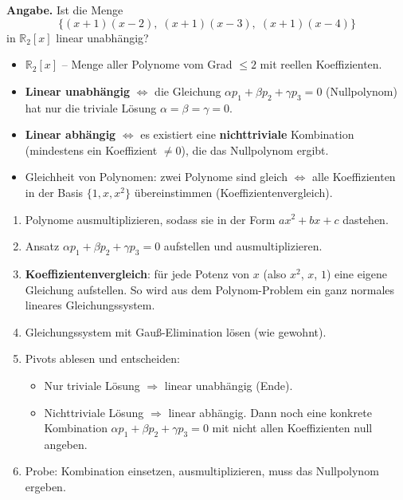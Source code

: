 \documentclass[a4paper,12pt]{article}
\begin{document}
\textbf{Angabe.} Ist die Menge
\[
\{(x+1)(x-2),\; (x+1)(x-3),\; (x+1)(x-4)\}
\]
in $\mathbb{R}_2[x]$ linear unabh\"angig?

\begin{begriffe}
\begin{itemize}[leftmargin=*, nosep]
    \item $\mathbb{R}_2[x]$ -- Menge aller Polynome vom Grad $\leq 2$ mit reellen Koeffizienten.
    \item \textbf{Linear unabh\"angig} $\iff$ die Gleichung $\alpha p_1 + \beta p_2 + \gamma p_3 = 0$ (Nullpolynom) hat nur die triviale L\"osung $\alpha = \beta = \gamma = 0$.
    \item \textbf{Linear abh\"angig} $\iff$ es existiert eine \textbf{nichttriviale} Kombination (mindestens ein Koeffizient $\neq 0$), die das Nullpolynom ergibt.
    \item Gleichheit von Polynomen: zwei Polynome sind gleich $\iff$ alle Koeffizienten in der Basis $\{1, x, x^2\}$ \"ubereinstimmen (Koeffizientenvergleich).
\end{itemize}
\end{begriffe}

\begin{wastun}
\begin{enumerate}[leftmargin=*, nosep]
    \item Polynome ausmultiplizieren, sodass sie in der Form $ax^2 + bx + c$ dastehen.
    \item Ansatz $\alpha p_1 + \beta p_2 + \gamma p_3 = 0$ aufstellen und ausmultiplizieren.
    \item \textbf{Koeffizientenvergleich}: f\"ur jede Potenz von $x$ (also $x^2$, $x$, $1$) eine eigene Gleichung aufstellen. So wird aus dem Polynom-Problem ein ganz normales lineares Gleichungssystem.
    \item Gleichungssystem mit Gau\ss-Elimination l\"osen (wie gewohnt).
    \item Pivots ablesen und entscheiden:
    \begin{itemize}[nosep]
        \item Nur triviale L\"osung $\Rightarrow$ linear unabh\"angig (Ende).
        \item Nichttriviale L\"osung $\Rightarrow$ linear abh\"angig. Dann noch eine konkrete Kombination $\alpha p_1 + \beta p_2 + \gamma p_3 = 0$ mit nicht allen Koeffizienten null angeben.
    \end{itemize}
    \item Probe: Kombination einsetzen, ausmultiplizieren, muss das Nullpolynom ergeben.
\end{enumerate}
\end{wastun}
\end{document}
